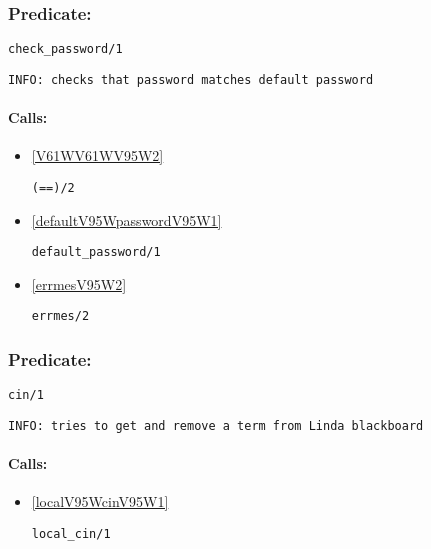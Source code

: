 \subsubsection{Predicate:} \label{checkV95WpasswordV95W1}

\begin{verbatim}
check_password/1
\end{verbatim}

{\small \begin{verbatim}
INFO: checks that password matches default password

\end{verbatim}}
\paragraph{Calls:} 
\begin{itemize}
\item \ref{V61WV61WV95W2} 
\begin{verbatim}
(==)/2
\end{verbatim}

\item \ref{defaultV95WpasswordV95W1} 
\begin{verbatim}
default_password/1
\end{verbatim}

\item \ref{errmesV95W2} 
\begin{verbatim}
errmes/2
\end{verbatim}

\end{itemize}

\subsubsection{Predicate:} \label{cinV95W1}

\begin{verbatim}
cin/1
\end{verbatim}

{\small \begin{verbatim}
INFO: tries to get and remove a term from Linda blackboard

\end{verbatim}}
\paragraph{Calls:} 
\begin{itemize}
\item \ref{localV95WcinV95W1} 
\begin{verbatim}
local_cin/1
\end{verbatim}

\end{itemize}

